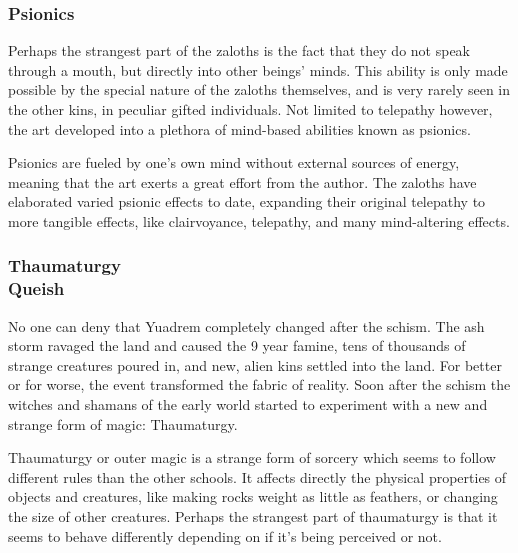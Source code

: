 \begin{linenumbers}
\subsubsection{Psionics} %
Perhaps the strangest part of the zaloths is the fact that they do not speak through a mouth, but directly into other beings' minds.
This ability is only made possible by the special nature of the zaloths themselves, and is very rarely seen in the other kins, in peculiar gifted individuals.
Not limited to telepathy however, the art developed into a plethora of mind-based abilities known as psionics.

Psionics are fueled by one's own mind without external sources of energy, meaning that the art exerts a great effort from the author.
The zaloths have elaborated varied psionic effects to date, expanding their original telepathy to more tangible effects, like clairvoyance, telepathy, and many mind-altering effects.


\subsubsection{Thaumaturgy\\ \small{Queish}} %

No one can deny that Yuadrem completely changed after the schism.
The ash storm ravaged the land and caused the 9 year famine, tens of thousands of strange creatures poured in, and new, alien kins settled into the land.
For better or for worse, the event transformed the fabric of reality.
Soon after the schism the witches and shamans of the early world started to experiment with a new and strange form of magic: Thaumaturgy.

Thaumaturgy or outer magic is a strange form of sorcery which seems to follow different rules than the other schools.
It affects directly the physical properties of objects and creatures, like making rocks weight as little as feathers, or changing the size of other creatures.
Perhaps the strangest part of thaumaturgy is that it seems to behave differently depending on if it's being perceived or not.%


\end{linenumbers}

